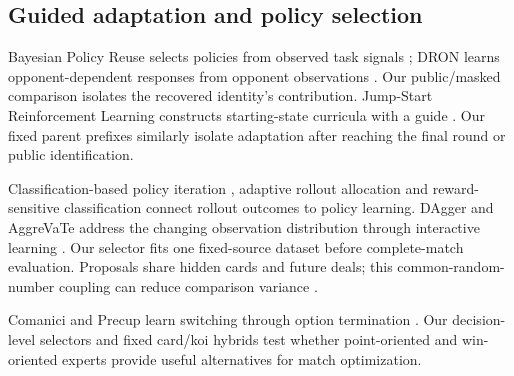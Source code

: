 \subsection{Guided adaptation and policy selection}
Bayesian Policy Reuse selects policies from observed task signals
\cite{rosman2016reuse}; DRON learns opponent-dependent responses from opponent
observations \cite{he2016opponent}. Our public/masked comparison isolates the
recovered identity's contribution. Jump-Start Reinforcement Learning constructs
starting-state curricula with a guide \cite{uchendu2023jump}. Our fixed parent
prefixes similarly isolate adaptation after reaching the final round or
public identification.

Classification-based policy iteration \cite{lagoudakis2003classification},
adaptive rollout allocation \cite{dimitrakakis2008rollout} and reward-sensitive
classification \cite{langford2005classification} connect rollout outcomes to
policy learning. DAgger and AggreVaTe address the changing observation
distribution through interactive learning \cite{ross2011dagger,ross2014aggrevate}.
Our selector fits one fixed-source dataset before complete-match evaluation.
Proposals share hidden cards and future deals; this common-random-number
coupling can reduce comparison variance \cite{yadav2026common}.

Comanici and Precup learn switching through option termination
\cite{comanici2010switching}. Our decision-level selectors and fixed card/koi
hybrids test whether point-oriented and win-oriented experts provide useful
alternatives for match optimization.
